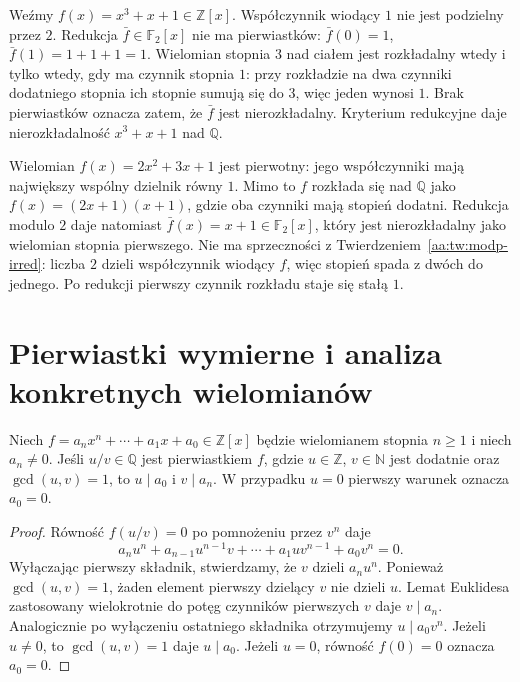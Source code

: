 \begin{przyklad}
\label{aa:prz:cubic-mod2-irreducibility}
Weźmy $f(x)=x^3+x+1\in\mathbb Z[x]$.
Współczynnik wiodący $1$ nie jest podzielny przez $2$.
Redukcja $\bar f\in\mathbb F_2[x]$ nie ma pierwiastków:
$\bar f(0)=1$, $\bar f(1)=1+1+1=1$.
Wielomian stopnia $3$ nad ciałem jest rozkładalny
wtedy i tylko wtedy, gdy ma czynnik stopnia $1$:
przy rozkładzie na dwa czynniki dodatniego stopnia
ich stopnie sumują się do $3$, więc jeden wynosi $1$.
Brak pierwiastków oznacza zatem, że $\bar f$
jest nierozkładalny. Kryterium redukcyjne daje
nierozkładalność $x^3+x+1$ nad $\mathbb Q$.
\end{przyklad}

\begin{przyklad}
\label{aa:prz:modp-leading-coefficient-necessary}
Wielomian $f(x)=2x^2+3x+1$ jest pierwotny:
jego współczynniki mają największy wspólny dzielnik
równy $1$. Mimo to $f$ rozkłada się nad
$\mathbb Q$ jako
$f(x)=(2x+1)(x+1)$, gdzie oba czynniki mają
stopień dodatni. Redukcja modulo $2$ daje natomiast
$\bar f(x)=x+1\in\mathbb F_2[x]$, który jest
nierozkładalny jako wielomian stopnia pierwszego.
Nie ma sprzeczności z
Twierdzeniem~\ref{aa:tw:modp-irred}: liczba $2$
dzieli współczynnik wiodący $f$, więc stopień
spada z dwóch do jednego. Po redukcji pierwszy
czynnik rozkładu staje się stałą $1$.
\end{przyklad}

\section{Pierwiastki wymierne i analiza konkretnych wielomianów}
\begin{twierdzenie}
\label{aa:tw:rational-root}
Niech $f=a_nx^n+\cdots+a_1x+a_0\in\mathbb Z[x]$
będzie wielomianem stopnia $n\ge1$ i niech $a_n\ne0$.
Jeśli $u/v\in\mathbb Q$ jest pierwiastkiem $f$,
gdzie $u\in\mathbb Z$, $v\in\mathbb N$ jest dodatnie
oraz $\gcd(u,v)=1$, to $u\mid a_0$ i $v\mid a_n$.
W przypadku $u=0$ pierwszy warunek oznacza $a_0=0$.
\end{twierdzenie}
\begin{proof}
Równość $f(u/v)=0$ po pomnożeniu przez $v^n$
daje
\[
 a_nu^n+a_{n-1}u^{n-1}v+\cdots+a_1uv^{n-1}+a_0v^n=0.
\]
Wyłączając pierwszy składnik, stwierdzamy, że
$v$ dzieli $a_nu^n$. Ponieważ $\gcd(u,v)=1$,
żaden element pierwszy dzielący $v$ nie dzieli $u$.
Lemat Euklidesa zastosowany wielokrotnie do potęg
czynników pierwszych $v$ daje $v\mid a_n$.
Analogicznie po wyłączeniu ostatniego składnika
otrzymujemy $u\mid a_0v^n$. Jeżeli $u\ne0$,
to $\gcd(u,v)=1$ daje $u\mid a_0$. Jeżeli $u=0$,
równość $f(0)=0$ oznacza $a_0=0$.
\end{proof}

